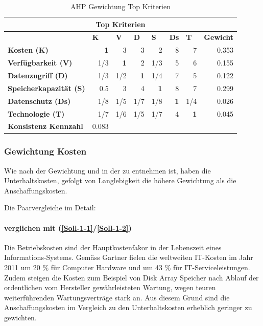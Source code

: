 \begin{table}[htbp]
\caption{AHP Gewichtung Top Kriterien}
\begin{tabular}{|l|r|r|r|r|r|r|r|}
\hline
\multicolumn{ 8}{|c|}{\textbf{Top Kriterien}} \\ \hline
 & \multicolumn{1}{l|}{\textbf{K}} & \multicolumn{1}{l|}{\textbf{V}} & \multicolumn{1}{l|}{\textbf{D}} & \multicolumn{1}{l|}{\textbf{S}} & \multicolumn{1}{l|}{\textbf{Ds}} & \multicolumn{1}{l|}{\textbf{T}} & \multicolumn{1}{l|}{\textbf{Gewicht}} \\ \hline
\textbf{Kosten (K)} & \textbf{1} & 3 & 3 & 2 & 8 & 7 & 0.353 \\ \hline
\textbf{Verfügbarkeit (V)} & 1/3 & \textbf{1} & 2 & 1/3 & 5 & 6 & 0.155 \\ \hline
\textbf{Datenzugriff (D)} & 1/3 & 1/2 & \textbf{1} & 1/4 & 7 & 5 & 0.122 \\ \hline
\textbf{Speicherkapazität (S)} & 0.5 & 3 & 4 & \textbf{1} & 8 & 7 & 0.299 \\ \hline
\textbf{Datenschutz (Ds)} & 1/8 & 1/5 & 1/7 & 1/8 & \textbf{1} & 1/4 & 0.026 \\ \hline
\textbf{Technologie (T)} & 1/7 & 1/6 & 1/5 & 1/7 & 4 & \textbf{1} & 0.045 \\ \hline
\textbf{Konsistenz Kennzahl} & 0.083 \\ \cline{1-2}
\end{tabular}
\label{AHPTop}
\end{table}

\subsubsection*{Gewichtung Kosten}

Wie nach der Gewichtung und in der  zu entnehmen ist, haben die Unterhaltskosten, gefolgt von Langlebigkeit die höhere Gewichtung als die Anschaffungskosten.

Die Paarvergleiche im Detail:

\paragraph*{ verglichen mit  (\ref{Soll-1-1}/\ref{Soll-1-2})}
Die Betriebskosten sind der Hauptkostenfakor in der Lebenszeit eines Informations-Systems. Gemäss Gartner fielen die weltweiten IT-Kosten im Jahr 2011 um 20 \% für Computer Hardware und um 43 \% für IT-Serviceleistungen. Zudem steigen die Kosten zum Beispiel von Disk Array Speicher nach Ablauf der ordentlichen vom Hersteller gewährleisteten Wartung, wegen teuren weiterführenden Wartungsverträge stark an.
Aus diesem Grund sind die Anschaffungskosten im Vergleich zu den Unterhaltskosten erheblich geringer zu gewichten.

